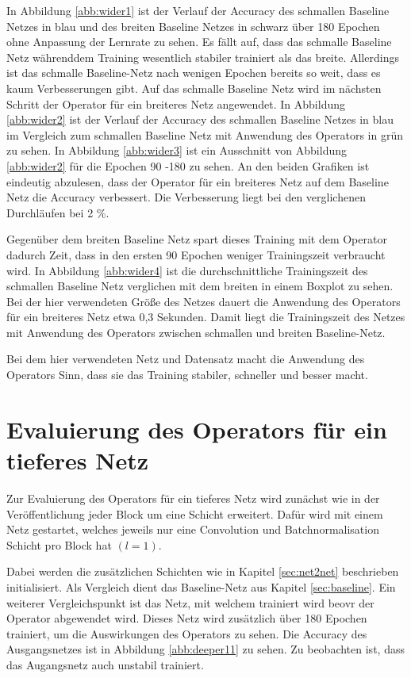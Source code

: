 In Abbildung \ref{abb:wider1} ist der Verlauf der Accuracy des schmallen Baseline Netzes in blau und des breiten Baseline Netzes in schwarz über 180 Epochen ohne Anpassung der Lernrate zu sehen. Es fällt auf, dass das schmalle Baseline Netz währenddem Training wesentlich stabiler trainiert als das breite. Allerdings ist das schmalle Baseline-Netz nach wenigen Epochen bereits so weit, dass es kaum Verbesserungen gibt. Auf das schmalle Baseline Netz wird im nächsten Schritt der Operator für ein breiteres Netz angewendet. In Abbildung \ref{abb:wider2} ist der Verlauf der Accuracy des schmallen Baseline Netzes in blau im Vergleich zum schmallen Baseline Netz mit Anwendung des Operators in grün zu sehen. In Abbildung \ref{abb:wider3} ist ein Ausschnitt von Abbildung \ref{abb:wider2} für die Epochen 90 -180 zu sehen. An den beiden Grafiken ist eindeutig abzulesen, dass der Operator für ein breiteres Netz auf dem Baseline Netz die Accuracy verbessert. Die Verbesserung liegt bei den verglichenen Durchläufen bei 2 \%. 

Gegenüber dem breiten Baseline Netz spart dieses Training mit dem Operator dadurch Zeit, dass in den ersten 90 Epochen weniger Trainingszeit verbraucht wird. In Abbildung \ref{abb:wider4} ist die durchschnittliche Trainingszeit des schmallen Baseline Netz verglichen mit dem breiten in einem Boxplot zu sehen. Bei der hier verwendeten Größe des Netzes dauert die Anwendung des Operators für ein breiteres Netz etwa 0,3 Sekunden. Damit liegt die Trainingszeit des Netzes mit Anwendung des Operators zwischen schmallen und breiten Baseline-Netz.


Bei dem hier verwendeten Netz und Datensatz macht die Anwendung des Operators Sinn, dass sie das Training stabiler, schneller und besser macht.





\section{Evaluierung des Operators für ein tieferes Netz}
Zur Evaluierung des Operators für ein tieferes Netz wird zunächst wie in der Veröffentlichung jeder Block um eine Schicht erweitert. Dafür wird mit einem Netz gestartet, welches jeweils nur eine Convolution und Batchnormalisation Schicht pro Block hat $ (l=1)$. 

Dabei werden die zusätzlichen Schichten wie in Kapitel \ref{sec:net2net} beschrieben initialisiert. Als Vergleich dient das Baseline-Netz aus Kapitel \ref{sec:baseline}. Ein weiterer Vergleichspunkt ist das Netz, mit welchem trainiert wird beovr der Operator abgewendet wird. Dieses Netz wird zusätzlich über 180 Epochen trainiert, um die Auswirkungen des Operators zu sehen. Die Accuracy des Ausgangsnetzes ist in Abbildung \ref{abb:deeper11} zu sehen. Zu beobachten ist, dass das Augangsnetz auch unstabil trainiert. 

